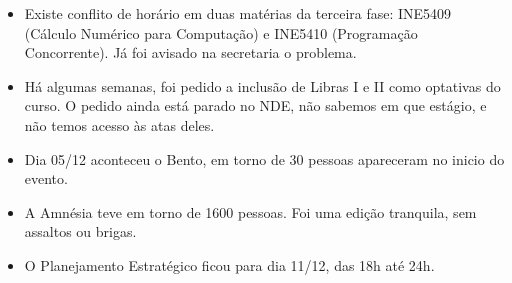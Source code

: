 \documentclass{ata-calico}
\begin{document}
\maketitle

\begin{itemize}
\item Existe conflito de horário em duas matérias da terceira fase: INE5409 (Cálculo Numérico para Computação) e INE5410 (Programação Concorrente). Já foi avisado na secretaria o problema.
\item Há algumas semanas, foi pedido a inclusão de Libras I e II como optativas do curso. O pedido ainda está parado no NDE, não sabemos em que estágio, e não temos acesso às atas deles.
\item Dia 05/12 aconteceu o Bento, em torno de 30 pessoas apareceram no inicio do evento.
\item A Amnésia teve em torno de 1600 pessoas. Foi uma edição tranquila, sem assaltos ou brigas.
\item O Planejamento Estratégico ficou para dia 11/12, das 18h até 24h.
\end{itemize}
\end{document}

